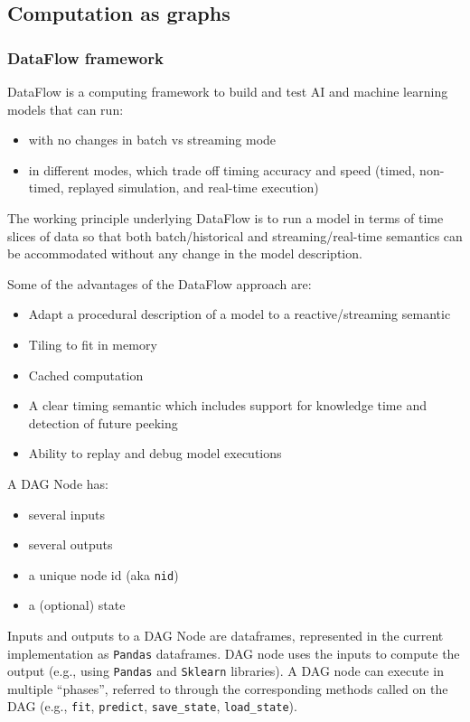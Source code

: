 \documentclass[11pt, reqno]{amsart}
\theoremstyle{definition}
\theoremstyle{remark}
\begin{document}
\subsection{Computation as graphs}

\subsubsection{DataFlow framework}
DataFlow is a computing framework to build and test AI and machine learning
models that can run:
\begin{itemize}
  \item with no changes in batch vs streaming mode
  \item in different modes, which trade off timing accuracy and speed (timed,
        non-timed, replayed simulation, and real-time execution)
\end{itemize}

The working principle underlying DataFlow is to run a model in terms of time
slices of data so that both batch/historical and streaming/real-time semantics
can be accommodated without any change in the model description.

Some of the advantages of the DataFlow approach are:
\begin{itemize}
  \item Adapt a procedural description of a model to a reactive/streaming semantic
  \item Tiling to fit in memory
  \item Cached computation
  \item A clear timing semantic which includes support for knowledge time and
        detection of future peeking
  \item Ability to replay and debug model executions
\end{itemize}

A DAG Node has:
\begin{itemize}
  \item several inputs
  \item several outputs
  \item a unique node id (aka \verb|nid|)
  \item a (optional) state
\end{itemize}

Inputs and outputs to a DAG Node are dataframes, represented in the current
implementation as \verb|Pandas| dataframes.
DAG node uses the inputs to compute the output (e.g., using \verb|Pandas| and
\verb|Sklearn| libraries).
A DAG node can execute in multiple ``phases'', referred to through the
corresponding methods called on the DAG (e.g., \verb|fit|, \verb|predict|,
\verb|save_state|, \verb|load_state|).
\end{document}
